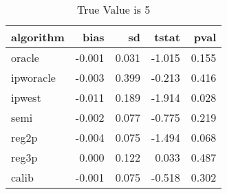 \begin{table}[h!]

\caption{True Value is 5}
\centering
\begin{tabular}[t]{lrrrr}
\toprule
algorithm & bias & sd & tstat & pval\\
\midrule
oracle & -0.001 & 0.031 & -1.015 & 0.155\\
ipworacle & -0.003 & 0.399 & -0.213 & 0.416\\
ipwest & -0.011 & 0.189 & -1.914 & 0.028\\
semi & -0.002 & 0.077 & -0.775 & 0.219\\
reg2p & -0.004 & 0.075 & -1.494 & 0.068\\
\addlinespace
reg3p & 0.000 & 0.122 & 0.033 & 0.487\\
calib & -0.001 & 0.075 & -0.518 & 0.302\\
\bottomrule
\end{tabular}
\end{table}
